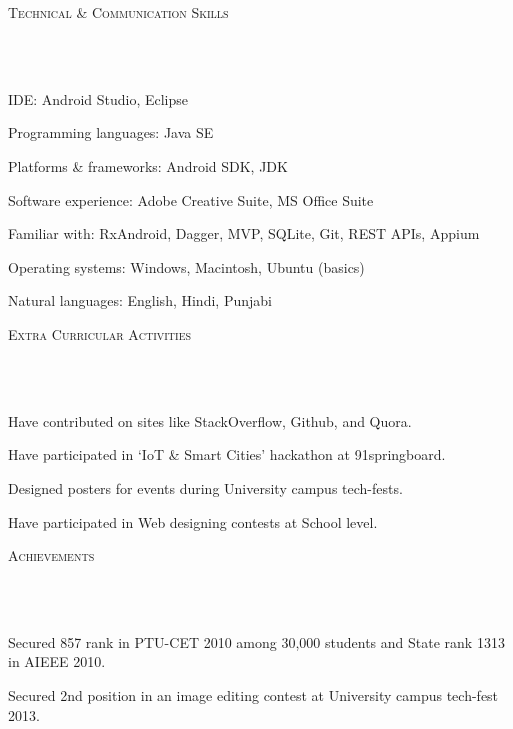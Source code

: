 \documentclass{article}
\newcommand{\header}[1]{{
\hspace*{-15pt}\vspace*{6pt} \textsc{#1}} \vspace*{-6pt} 
\lineunder
}
\newcommand{\lineunder}{
\vspace*{-8pt} \\ \hspace*{-18pt} 
\hrulefill \\
}
\renewcommand{\labelitemii}{
$\vcenter{\hbox{\tiny$\bullet$}}$\hspace*{-3pt}
}
\newenvironment{bullet-list-major}{
\begin{list}{\labelitemii}{\setlength\leftmargin{3pt} 
\topsep 0pt \itemsep -2pt}}{\vspace*{4pt}\end{list}
}
\begin{document}
\vspace*{4pt}%
\header{Technical \& Communication Skills}
    \begin{bullet-list-major}
    \item IDE: Android Studio, Eclipse
    \vspace{2pt}
    \item Programming languages: Java SE
    \vspace{2pt}
    \item Platforms \& frameworks: Android SDK, JDK
    \vspace{2pt}
    \item Software experience: Adobe Creative Suite, MS Office Suite
    \vspace{2pt}
    \item Familiar with: RxAndroid, Dagger, MVP, SQLite, Git, REST APIs, Appium
    \vspace{2pt}
    \item Operating systems: Windows, Macintosh, Ubuntu (basics)
    \vspace{2pt}
    \item Natural languages: English, Hindi, Punjabi
    \end{bullet-list-major}

\vspace*{4pt}%
\header{Extra Curricular Activities}
    \begin{bullet-list-major}
    \item  Have contributed on sites like StackOverflow, Github, and Quora.
    \vspace{2pt}
    \item  Have participated in `IoT \& Smart Cities' hackathon at 91springboard.
    \vspace{2pt}
    \item  Designed posters for events during University campus tech-fests.
    \vspace{2pt}
    \item  Have participated in Web designing contests at School level.
    \end{bullet-list-major}

\vspace*{4pt}%
\header{Achievements}
    \begin{bullet-list-major}
    \item Secured 857 rank in PTU-CET 2010 among 30,000 students and State rank 1313 in AIEEE 2010.
    \item  Secured 2nd position in an image editing contest at University campus tech-fest 2013.
    \end{bullet-list-major}
\end{document}
